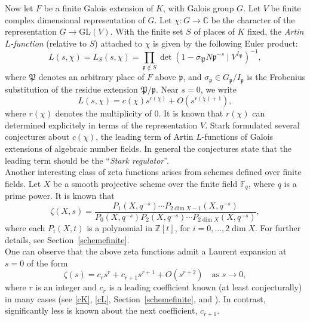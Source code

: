 \documentclass[12pt]{amsart}
\begin{document}
Now let $F$ be a finite Galois extension of $K$, with Galois group $G$. Let $V$ be finite complex dimensional representation of $G$. Let   $\chi: G \to \mathbb{C} $ be 
the character of the  representation $G \to \mathrm{GL}(V)$.  With the finite set $S$ of places of $K$ fixed, the \emph{Artin $L$-function} (relative to $S$) attached to $\chi$ is given by the following Euler product:
\begin{equation}
L(s, \chi) = L_S(s, \chi) = \prod_{\mathfrak{p} \notin S} \det(1 - \sigma_{\mathfrak{P}} N\mathfrak{p}^{-s} \mid V^{I_{\mathfrak{
P}}})^{-1},
\end{equation}
where $\mathfrak{P}$ denotes an arbitrary place of $F$ above $\mathfrak{p}$, and $\sigma_{\mathfrak{p}} \in G_{\mathfrak{p}}/I_{\mathfrak{p}}$ is the Frobenius substitution of the residue extension $\mathfrak{P}/\mathfrak{p}$. 
Near $s = 0$, we write
\begin{equation}\label{cL}
L(s, \chi) = c(\chi)  s^{r(\chi)} + O(s^{r(\chi)+1}),
\end{equation}
where $r(\chi)$ denotes the multiplicity of $0$. It is known that $r(\chi)$ can determined explicitely in terms of the representation $V$.  
Stark 
\cite{Stark-1, Stark-2, Stark-3, Stark-4, Stark-Hilbert} formulated several conjectures about $c(\chi)$, the leading term of Artin $L$-functions of Galois extensions of algebraic number fields.   In general the conjectures state that the leading term should be the ``\emph{Stark regulator}''. \\

Another interesting class of zeta functions arises from schemes defined over finite fields. Let $X$ be a smooth projective scheme over the finite field $\mathbb{F}_q$, where $q$ is a prime power. It is known that
\[
\zeta(X, s) = \frac{P_1(X, q^{-s}) \cdots P_{2\dim X - 1}(X, q^{-s})}{P_0(X, q^{-s}) P_2(X, q^{-s}) \cdots P_{2\dim X}(X, q^{-s})},
\]
where each $P_i(X, t)$ is a polynomial in $\mathbb{Z}[t]$, for $i = 0, \dots, 2\dim X$. For further details, see Section~\ref{schemefinite}.\\

One can observe that the above zeta functions admit a Laurent expansion at $s = 0$ of the form
\[
\zeta(s) = c_r s^{r} + c_{r+1} s^{r+1} + O(s^{r+2}) \quad \text{as } s \to 0,
\]
 where $r$ is an integer and $c_r$ is a leading coefficient known  (at least conjecturally) in many cases (see \eqref{cK}, \eqref{cL}, Section~\ref{schemefinite}, and \cite{DixExposes, Milne1, Tate-zeta1, Tate-abelian, Tate-zeta2, Schneider-zeta}). In contrast, significantly less is known about the next coefficient, $c_{r+1}$.\\
\end{document}

